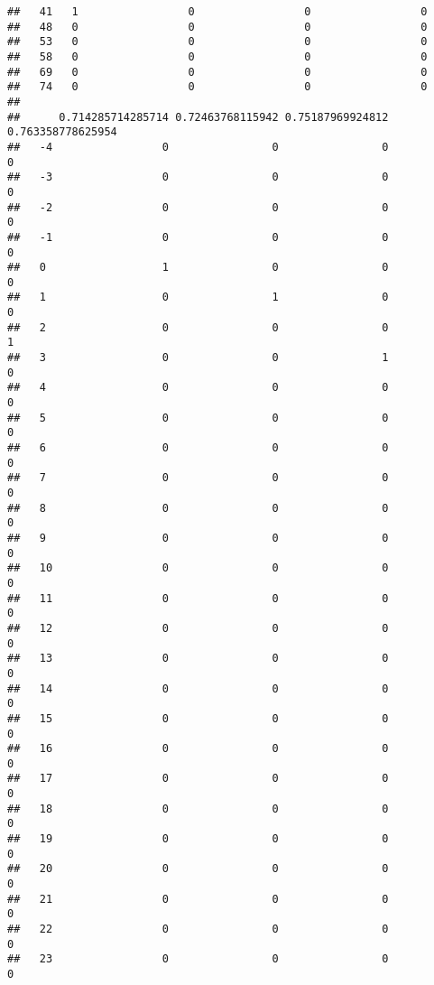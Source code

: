 \documentclass[]{article}
\begin{document}
\begin{verbatim}
##   41   1                 0                 0                 0
##   48   0                 0                 0                 0
##   53   0                 0                 0                 0
##   58   0                 0                 0                 0
##   69   0                 0                 0                 0
##   74   0                 0                 0                 0
##     
##      0.714285714285714 0.72463768115942 0.75187969924812 0.763358778625954
##   -4                 0                0                0                 0
##   -3                 0                0                0                 0
##   -2                 0                0                0                 0
##   -1                 0                0                0                 0
##   0                  1                0                0                 0
##   1                  0                1                0                 0
##   2                  0                0                0                 1
##   3                  0                0                1                 0
##   4                  0                0                0                 0
##   5                  0                0                0                 0
##   6                  0                0                0                 0
##   7                  0                0                0                 0
##   8                  0                0                0                 0
##   9                  0                0                0                 0
##   10                 0                0                0                 0
##   11                 0                0                0                 0
##   12                 0                0                0                 0
##   13                 0                0                0                 0
##   14                 0                0                0                 0
##   15                 0                0                0                 0
##   16                 0                0                0                 0
##   17                 0                0                0                 0
##   18                 0                0                0                 0
##   19                 0                0                0                 0
##   20                 0                0                0                 0
##   21                 0                0                0                 0
##   22                 0                0                0                 0
##   23                 0                0                0                 0

\end{verbatim}
\end{document}
